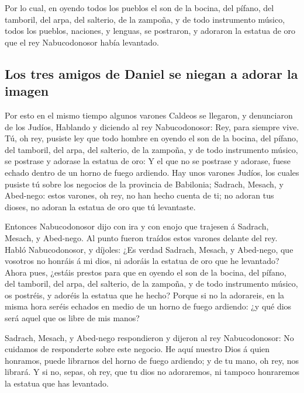 Por lo cual, en oyendo todos los pueblos el son de la
bocina, del pífano, del tamboril, del arpa, del salterio, de la zampoña,
y de todo instrumento músico, todos los pueblos, naciones, y lenguas, se
postraron, y adoraron la estatua de oro que el rey Nabucodonosor había
levantado.

\hypertarget{los-tres-amigos-de-daniel-se-niegan-a-adorar-la-imagen}{%
\subsection{Los tres amigos de Daniel se niegan a adorar la
imagen}\label{los-tres-amigos-de-daniel-se-niegan-a-adorar-la-imagen}}

 Por esto en el mismo tiempo algunos varones Caldeos se
llegaron, y denunciaron de los Judíos,  Hablando y diciendo
al rey Nabucodonosor: Rey, para siempre vive.  Tú, oh rey,
pusiste ley que todo hombre en oyendo el son de la bocina, del pífano,
del tamboril, del arpa, del salterio, de la zampoña, y de todo
instrumento músico, se postrase y adorase la estatua de oro:
 Y el que no se postrase y adorase, fuese echado dentro de
un horno de fuego ardiendo.  Hay unos varones Judíos, los
cuales pusiste tú sobre los negocios de la provincia de Babilonia;
Sadrach, Mesach, y Abed-nego: estos varones, oh rey, no han hecho cuenta
de ti; no adoran tus dioses, no adoran la estatua de oro que tú
levantaste.

 Entonces Nabucodonosor dijo con ira y con enojo que
trajesen á Sadrach, Mesach, y Abed-nego. Al punto fueron traídos estos
varones delante del rey.  Habló Nabucodonosor, y díjoles:
¿Es verdad Sadrach, Mesach, y Abed-nego, que vosotros no honráis á mi
dios, ni adoráis la estatua de oro que he levantado?  Ahora
pues, ¿estáis prestos para que en oyendo el son de la bocina, del
pífano, del tamboril, del arpa, del salterio, de la zampoña, y de todo
instrumento músico, os postréis, y adoréis la estatua que he hecho?
Porque si no la adorareis, en la misma hora seréis echados en medio de
un horno de fuego ardiendo: ¿y qué dios será aquel que os libre de mis
manos?

 Sadrach, Mesach, y Abed-nego respondieron y dijeron al rey
Nabucodonosor: No cuidamos de responderte sobre este negocio.
 He aquí nuestro Dios á quien honramos, puede librarnos del
horno de fuego ardiendo; y de tu mano, oh rey, nos librará.
 Y si no, sepas, oh rey, que tu dios no adoraremos, ni
tampoco honraremos la estatua que has levantado.

